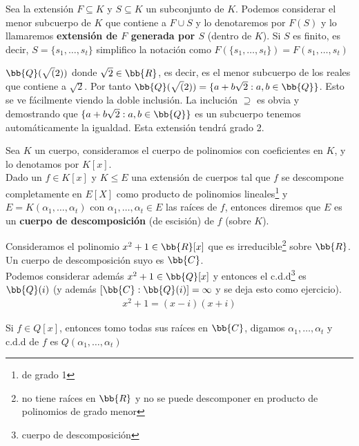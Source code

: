 \begin{notacion}
    Sea la extensión $F\subseteq K$ y $S\subseteq K$ un subconjunto de $K$. Podemos considerar el menor subcuerpo de $K$ que contiene a $F\cup S$ y lo denotaremos por $F(S)$ y lo llamaremos \textbf{extensión de $F$ generada por $S$} (dentro de $K$). Si $S$ es finito, es decir, $S=\{s_1,\dots,s_t\}$ simplifico la notación como $F(\{s_1,\dots,s_t\}) = F(s_1,\dots,s_t)$
\end{notacion}

\begin{ejemplo}
    $\bb{Q}(\sqrt(2))$ donde $\sqrt{2}\in \bb{R}$, es decir, es el menor subcuerpo de los reales que contiene a $\sqrt{2}$. Por tanto $\bb{Q}(\sqrt(2)) = \{a+b\sqrt{2} : a,b\in \bb{Q}\}$. Esto se ve fácilmente viendo la doble inclusión. La inclución $\supseteq$ es obvia y demostrando que $\{a+b\sqrt{2} : a,b\in \bb{Q}\}$ es un subcuerpo tenemos automáticamente la igualdad. Esta extensión tendrá grado 2.
\end{ejemplo}

\begin{definicion}
    Sea $K$ un cuerpo, consideramos el cuerpo de polinomios con coeficientes en $K$, y lo denotamos por $K[x]$. \\
    
    Dado un $f\in K[x]$ y $K\leq E$ una extensión de cuerpos tal que $f$ se descompone completamente en $E[X]$ como producto de polinomios lineales\footnote{de grado 1} y $E=K(\alpha_1,\dots,\alpha_t)$ con $\alpha_1, \dots, \alpha_t\in E$ las raíces de $f$, entonces diremos que $E$ es un \textbf{cuerpo de descomposición} (de escisión) de $f$ (sobre $K$).
\end{definicion}

\begin{ejemplo}
    Consideramos el polinomio $x^2 + 1 \in \bb{R}[x]$ que es irreducible\footnote{no tiene raíces en $\bb{R}$ y no se puede descomponer en producto de polinomios de grado menor} sobre $\bb{R}$. Un cuerpo de descomposición suyo es $\bb{C}$.\\

    Podemos considerar además $x^2+1 \in \bb{Q}[x]$ y entonces el c.d.d\footnote{cuerpo de descomposición} es $\bb{Q}(i)$ (y además $[\bb{C} : \bb{Q}(i)]=\infty$ y se deja esto como ejercicio).
    \begin{gather*}
        x^2 +1 = (x-i)(x+i)
    \end{gather*}
\end{ejemplo}

\begin{observacion}
    Si $f\in Q[x]$, entonces tomo todas sus raíces en $\bb{C}$, digamos $\alpha_1, \dots, \alpha_t$ y c.d.d de $f$ es $Q(\alpha_1, \dots, \alpha_t)$
\end{observacion}


